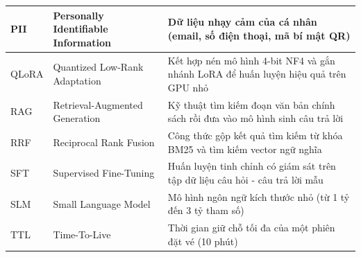 \begin{table}[!ht]
\begin{tabularx}{\textwidth}{|L{2.0cm}|L{4.4cm}|X|}
\hline
PII & Personally Identifiable Information & Dữ liệu nhạy cảm của cá nhân (email, số điện thoại, mã bí mật QR) \\
\hline
QLoRA & Quantized Low-Rank Adaptation & Kết hợp nén mô hình 4-bit NF4 và gắn nhánh LoRA để huấn luyện hiệu quả trên GPU nhỏ \\
\hline
RAG & Retrieval-Augmented Generation & Kỹ thuật tìm kiếm đoạn văn bản chính sách rồi đưa vào mô hình sinh câu trả lời \\
\hline
RRF & Reciprocal Rank Fusion & Công thức gộp kết quả tìm kiếm từ khóa BM25 và tìm kiếm vector ngữ nghĩa \\
\hline
SFT & Supervised Fine-Tuning & Huấn luyện tinh chỉnh có giám sát trên tập dữ liệu câu hỏi - câu trả lời mẫu \\
\hline
SLM & Small Language Model & Mô hình ngôn ngữ kích thước nhỏ (từ 1 tỷ đến 3 tỷ tham số) \\
\hline
TTL & Time-To-Live & Thời gian giữ chỗ tối đa của một phiên đặt vé (10 phút) \\
\hline
\end{tabularx}
\end{table}
